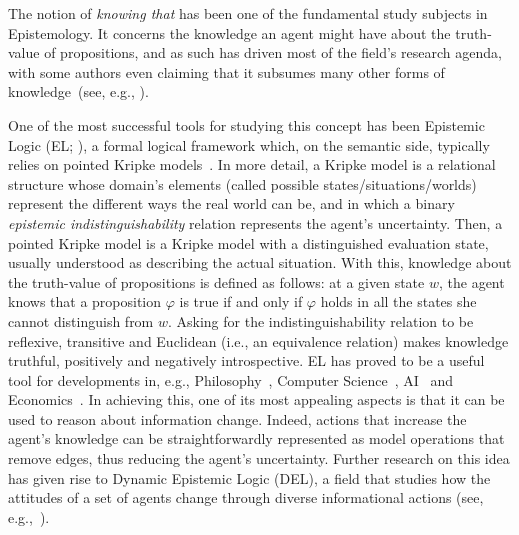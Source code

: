 The notion of \emph{knowing that} has been one of the fundamental study subjects in Epistemology. It concerns the knowledge an agent might have about the truth-value of propositions, and as such has driven most of the field's research agenda, with some authors even claiming that it subsumes many other forms of knowledge~(see, e.g., \cite{BoenLycan75,stanley2001knowing,Snowdon2004}). 

 
One of the most successful tools for studying this concept has been Epistemic Logic (EL; \cite{Hintikka:kab}), a formal logical framework which, on the semantic side, typically relies on pointed Kripke models~\cite{mlbook,HML}. In more detail, a Kripke model is a relational structure whose domain's elements (called possible states/situations/worlds) represent the different ways the real world can be, and in which a binary \emph{epistemic indistinguishability} relation represents the agent's uncertainty. Then, a pointed Kripke model is a Kripke model with a distinguished evaluation state, usually understood as describing the actual situation. With this, knowledge about the truth-value of propositions is defined as follows: at a given state $w$, the agent knows that a proposition $\varphi$ is true if and only if $\varphi$ holds in all the states she cannot distinguish from $w$. Asking for the indistinguishability relation to be reflexive, transitive and Euclidean (i.e., an equivalence relation) makes knowledge truthful, positively and negatively introspective. EL has proved to be a useful tool for developments in, e.g., Philosophy~\cite{rfe,Holliday2018}, Computer Science~\cite{RAK}, AI~\cite{elfaics} and Economics~\cite{egepgt}. In achieving this, one of its most appealing aspects is that it can be used to reason about information change. Indeed, actions that increase the agent's knowledge can be straightforwardly represented as model operations that remove edges, thus reducing the agent's uncertainty. Further research on this idea has given rise to Dynamic Epistemic Logic (DEL), a field that studies how the attitudes of a set of agents change through diverse informational actions (see, e.g.,~\cite{DELbook,vanBenthem2011ldii}). 


